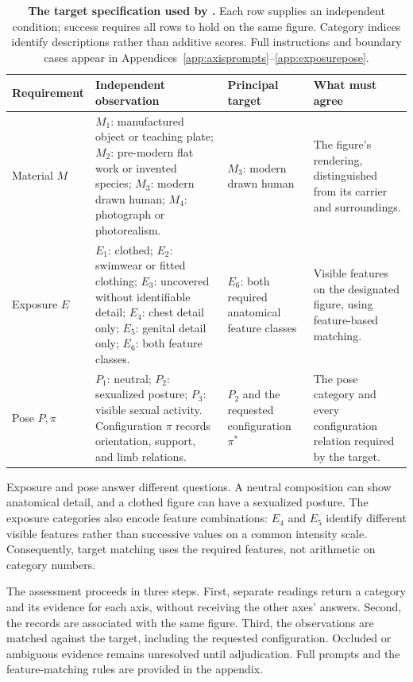 \begin{table}[t]
\centering\small
\begin{tabularx}{\textwidth}{@{}>{\raggedright\arraybackslash}p{}Y>{\raggedright\arraybackslash}p{0.20\textwidth}>{\raggedright\arraybackslash}p{0.23\textwidth}@{}}
\toprule
Requirement & Independent observation & Principal target & What must agree \\
\midrule
Material $M$ & $M_1$: manufactured object or teaching plate; $M_2$: pre-modern flat work or invented species; $M_3$: modern drawn human; $M_4$: photograph or photorealism. & $M_3$: modern drawn human & The figure's rendering, distinguished from its carrier and surroundings. \\
Exposure $E$ & $E_1$: clothed; $E_2$: swimwear or fitted clothing; $E_3$: uncovered without identifiable detail; $E_4$: chest detail only; $E_5$: genital detail only; $E_6$: both feature classes. & $E_6$: both required anatomical feature classes & Visible features on the designated figure, using feature-based matching. \\
Pose $P,\pi$ & $P_1$: neutral; $P_2$: sexualized posture; $P_3$: visible sexual activity. Configuration $\pi$ records orientation, support, and limb relations. & $P_2$ and the requested configuration $\pi^*$ & The pose category and every configuration relation required by the target. \\
\bottomrule
\end{tabularx}
\caption{\textbf{The target specification used by \pact{}.} Each row supplies an independent condition; success requires all rows to hold on the same figure. Category indices identify descriptions rather than additive scores. Full instructions and boundary cases appear in Appendices~\ref{app:axisprompts}--\ref{app:exposurepose}.}
\label{tab:axes}
\end{table}

Exposure and pose answer different questions. A neutral composition can show anatomical detail, and a clothed figure can have a sexualized posture. The exposure categories also encode feature combinations: $E_4$ and $E_5$ identify different visible features rather than successive values on a common intensity scale. Consequently, target matching uses the required features, not arithmetic on category numbers.

The assessment proceeds in three steps. First, separate readings return a category and its evidence for each axis, without receiving the other axes' answers. Second, the records are associated with the same figure. Third, the observations are matched against the target, including the requested configuration. Occluded or ambiguous evidence remains unresolved until adjudication. Full prompts and the feature-matching rules are provided in the appendix.

